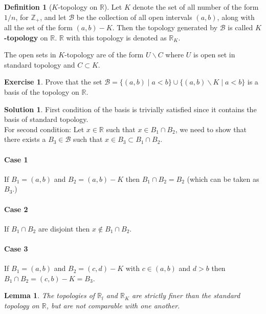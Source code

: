 \documentclass[12pt,reqno]{amsart}
\theoremstyle{plain}
\newtheorem{lem}{Lemma}
\theoremstyle{definition}
\newtheorem{defn}{Definition}
\newtheorem{exer}{Exercise}
\newtheorem*{sol*}{Solution}
\newcommand{\bb}[1]{\mathbb{#1}}
\begin{document}
\begin{defn}[$K$-topology on $\mathbb{R}$]
    Let $K$ denote the set of all number of the form $1/n$, for $\mathbb{Z}_+$, and let $\mathcal{B}$ be the collection of all open intervals $(a,b)$, along with all the set of the form $(a,b) - K$. Then the topology generated by $\mathcal{B}$ is called {\bf $K$-topology} on $ \mathbb{R}$. $\mathbb{R}$ with this topology is denoted as $\mathbb{R}_K$.
\end{defn}
\par The open sets in $K$-topology are of the form $U\backslash C$ where $U$ is open set in standard topology and $C \subset K$.
\begin{exer}
    Prove that the set $\mathcal{B} = \{(a,b) \mid a < b\} \cup \{(a,b) \backslash K \mid a < b\}$ is a basis of the topology on $\mathbb{R}$.
\end{exer}
\begin{sol*}
    First condition of the basis is trivially satisfied since it contains the basis of standard topology.\\
    For second condition: Let $x \in \mathbb{R}$ such that $x \in B_1 \cap B_2$, we need to show that there exists a $B_3 \in \mathcal{B}$ such that $x \in B_3 \subset B_1 \cap B_2$.
    \paragraph{\bf Case 1} If $B_1 = (a,b)$ and $B_2 = (a,b) - K$ then $B_1 \cap B_2 = B_2$ (which can be taken as $B_3$.)
    \paragraph{\bf Case 2} If $B_1 \cap B_2$ are disjoint then $x \notin B_1 \cap B_2$.
    \paragraph{\bf Case 3} If $B_1 = (a,b)$ and $B_2 = (c,d) - K$ with $c \in (a,b)$ and $d > b$ then $B_1 \cap B_2 = (c,b) - K = B_3$.
\end{sol*}
\begin{lem}
    The topologies of $\bb{R}_l$ and $\bb R_K$ are strictly finer than the standard topology on $\bb R$, but are not comparable with one another.
\end{lem}
\end{document}
